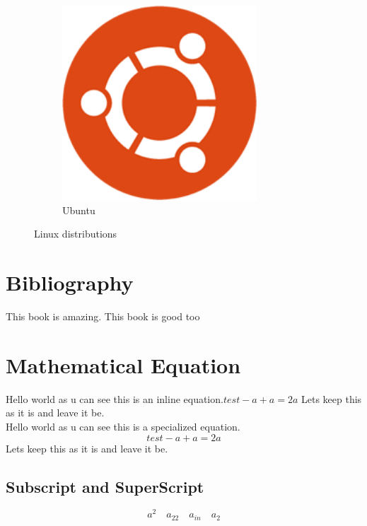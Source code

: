 \documentclass{article}
\begin{document}
\begin{figure}[h]
\begin{subfigure}{0.3\textwidth}
		\includegraphics[width=0.8\textwidth]{ubuntulogo.png}
		\caption{Ubuntu}
	\end{subfigure}
	
	\caption{Linux distributions}
\end{figure}


\section{Bibliography}

This book \cite{deng2009imagenet} is amazing. 
This book \cite{knuth1989mathematical} is good too

\section{Mathematical Equation}

Hello world as u can see this is an inline equation.$ test-a + a = 2a $ Lets keep this as it is and leave it be.\\Hello world as u can see this is a specialized equation.$$ test-a + a = 2a $$ Lets keep this as it is and leave it be.

\subsection{Subscript and SuperScript}
$$ a^2 \quad a_22 \quad a_{in} \quad a_{2} $$
\end{document}
